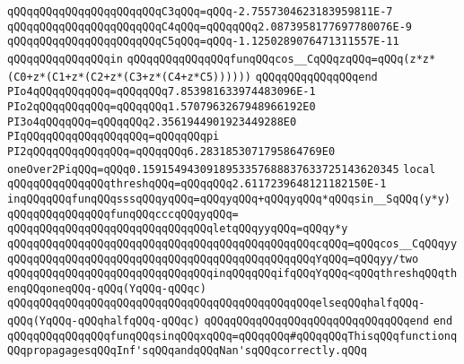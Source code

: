 \verb|qQQqqQQqqQQqqQQqqQQqqQQqC3qQQq=qQQq-2.7557304623183959811E-7|\newline
\verb|qQQqqQQqqQQqqQQqqQQqqQQqC4qQQq=qQQqqQQq2.0873958177697780076E-9|\newline
\verb|qQQqqQQqqQQqqQQqqQQqqQQqC5qQQq=qQQq-1.1250289076471311557E-11|\newline
\verb|qQQqqQQqqQQqqQQqin|\newline
\verb|qQQqqQQqqQQqqQQqfunqQQqcos__CqQQqzqQQq=qQQq(z*z*(C0+z*(C1+z*(C2+z*(C3+z*(C4+z*C5))))))|\newline
\verb|qQQqqQQqqQQqqQQqend|\newline
\newline
\verb|PIo4qQQqqQQqqQQq=qQQqqQQq7.853981633974483096E-1|\newline
\verb|PIo2qQQqqQQqqQQq=qQQqqQQq1.5707963267948966192E0|\newline
\verb|PI3o4qQQqqQQq=qQQqqQQq2.3561944901923449288E0|\newline
\verb|PIqQQqqQQqqQQqqQQqqQQq=qQQqqQQqpi|\newline
\verb|PI2qQQqqQQqqQQqqQQq=qQQqqQQq6.2831853071795864769E0|\newline
\verb|oneOver2PiqQQq=qQQq0.1591549430918953357688837633725143620345|\newline
\newline
\verb|local|\newline
\verb|qQQqqQQqqQQqqQQqthreshqQQq=qQQqqQQq2.6117239648121182150E-1|\newline
\verb|inqQQqqQQqfunqQQqsssqQQqyqQQq=qQQqyqQQq+qQQqyqQQq*qQQqsin__SqQQq(y*y)|\newline
\verb|qQQqqQQqqQQqqQQqfunqQQqcccqQQqyqQQq=|\newline
\verb|qQQqqQQqqQQqqQQqqQQqqQQqqQQqqQQqletqQQqyyqQQq=qQQqy*y|\newline
\verb|qQQqqQQqqQQqqQQqqQQqqQQqqQQqqQQqqQQqqQQqqQQqqQQqcqQQq=qQQqcos__CqQQqyy|\newline
\verb|qQQqqQQqqQQqqQQqqQQqqQQqqQQqqQQqqQQqqQQqqQQqqQQqYqQQq=qQQqyy/two|\newline
\verb|qQQqqQQqqQQqqQQqqQQqqQQqqQQqqQQqinqQQqqQQqifqQQqYqQQq<qQQqthreshqQQqthenqQQqoneqQQq-qQQq(YqQQq-qQQqc)|\newline
\verb|qQQqqQQqqQQqqQQqqQQqqQQqqQQqqQQqqQQqqQQqqQQqqQQqelseqQQqhalfqQQq-qQQq(YqQQq-qQQqhalfqQQq-qQQqc)|\newline
\verb|qQQqqQQqqQQqqQQqqQQqqQQqqQQqqQQqend|\newline
\verb|end|\newline
\verb|qQQqqQQqqQQqqQQqfunqQQqsinqQQqxqQQq=qQQqqQQq#qQQqqQQqThisqQQqfunctionqQQqpropagagesqQQqInf'sqQQqandqQQqNan'sqQQqcorrectly.qQQq|\newline
